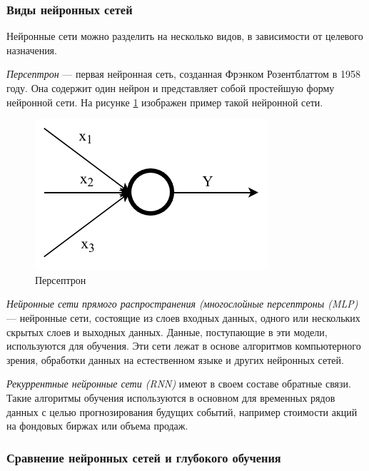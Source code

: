 \subsubsection{Виды нейронных сетей}

Нейронные сети можно разделить на несколько видов, в зависимости от целевого назначения. 

\textit{Персептрон} --- первая нейронная сеть, созданная Фрэнком Розентблаттом в 1958 году. Она содержит один нейрон и представляет собой простейшую форму нейронной сети. На рисунке \ref{fig:perceptron} изображен пример такой нейронной сети.

\begin{figure}[H]
	\centering
	\includegraphics[width=\textwidth]{img/perceptron.pdf}
	\caption{Персептрон}
	\label{fig:perceptron}
\end{figure}

\textit{Нейронные сети прямого распространения (многослойные персептроны (MLP)} --- нейронные сети, состоящие из слоев входных данных, одного или нескольких скрытых слоев и выходных данных. Данные, поступающие в эти модели, используются для обучения. Эти сети лежат в основе алгоритмов компьютерного зрения, обработки данных на естественном языке и других нейронных сетей.

\textit{Рекуррентные нейронные сети (RNN)} имеют в своем составе обратные связи. Такие алгоритмы обучения используются в основном для временных рядов данных с целью прогнозирования будущих событий, например стоимости акций на фондовых биржах или объема продаж.

\subsubsection{Сравнение нейронных сетей и глубокого обучения}

